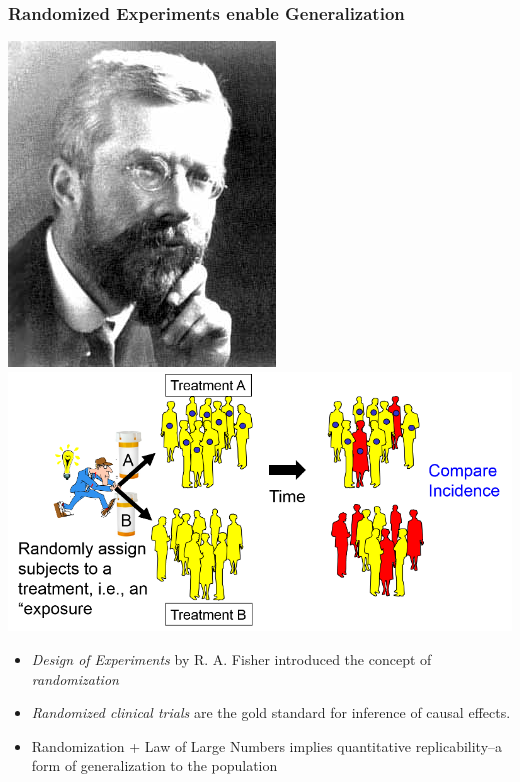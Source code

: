 \documentclass{beamer}
\begin{document}
\begin{frame}
\frametitle{Randomized Experiments enable Generalization}
\begin{center}
\includegraphics[scale = 0.3]{RA_Fisher.jpg}
\includegraphics[scale = 0.2]{RCT_Cartoon.png}
\end{center}
\begin{itemize}
\item \emph{Design of Experiments} by R. A. Fisher introduced the concept of \emph{randomization}\pause
\item \emph{Randomized clinical trials} are the gold standard
for inference of causal effects. \pause
\item Randomization + Law of Large Numbers implies quantitative replicability--a form of generalization to the population
\end{itemize}
\end{frame}
\end{document}

